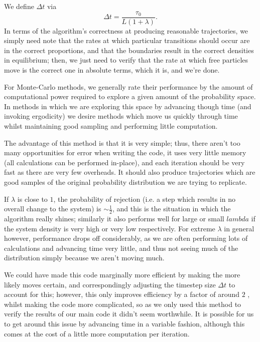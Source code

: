 We define $\Delta t$ via 
\begin{equation}
 \Delta t = \frac{\tau_0}{L (1+\lambda)}.
\end{equation}
In terms of the algorithm's correctness at producing reasonable trajectories, we simply need note that
the rates at which particular transitions should occur are in the correct proportions, and that the boundaries result in the correct densities in equilibrium;
then, we just need
to verify that the rate at which free particles move is the correct one in absolute terms, which it is,
and we're done. 

For Monte-Carlo methods, we generally rate their performance by the amount of computational
power required to explore a given amount of the probability space. In methods in which we
are exploring this space by advancing though time (and invoking ergodicity) we desire methods
which move us quickly through time whilst maintaining good sampling and performing little computation.

The advantage of this method is that it is very simple; thus, there aren't too many opportunities
for error when writing the code, it uses very little memory (all calculations can be performed
in-place), and each iteration should be very fast as there are very few overheads. It should also
produce trajectories which are good samples of the original probability distribution we are 
trying to replicate.


If $\lambda$
is close to $1$, the probability of rejection (i.e. a step which results in no overall change to
the system) is $\sim\frac{1}{2}$, and this is the situation in which the algorithm really shines; similarly
it also performs well for large or small $lambda$ if the system density is very high or very low
respectively. For extreme $\lambda$ in general however, performance drops off considerably, as
we are often performing lots of calculations and advancing time very little, and thus not seeing
much of the distribution simply because we aren't moving much.

We could have made this code marginally more efficient by making the more likely moves certain, and
correspondingly adjusting the timestep size $\Delta t$ to account for this; however, this only
improves efficiency by a factor of around $2$ , whilst making the code more complicated, so as
we only used this method to verify the results of our main code it didn't seem worthwhile.
It is possible for us to get
around this issue by advancing time in a variable fashion, although this comes at the cost of
a little more computation per iteration.

